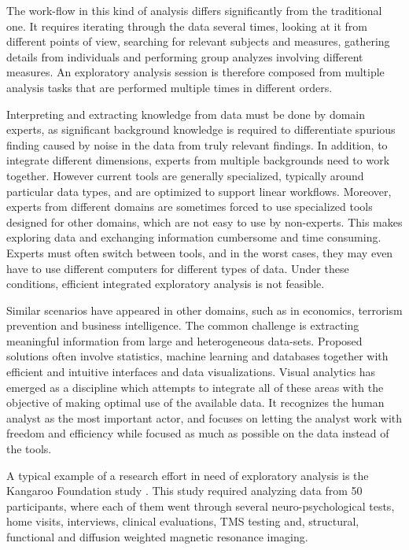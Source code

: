 \documentclass[utf8,paper]{frontiersSCNS} %
\begin{document}
				
The work-flow in this kind of analysis differs significantly from the traditional one. It requires iterating through the data several times, looking at it from different points of view, searching for relevant subjects and measures, gathering details from individuals and performing group analyzes involving different measures. An exploratory analysis session is therefore composed from multiple analysis tasks that are performed multiple times in different orders.

Interpreting and extracting knowledge from data must be done by domain experts, as significant background knowledge is required to differentiate spurious finding caused by noise in the data from truly relevant findings. In addition, to integrate different dimensions, experts from multiple backgrounds need to work together. However current tools are generally specialized, typically around particular data types, and are optimized to support linear workflows. Moreover, experts from different domains are sometimes forced to use specialized tools designed for other domains, which are not easy to use by non-experts.  This makes exploring data and exchanging information cumbersome and time consuming. Experts must often switch between tools, and in the worst cases, they may even have to use different computers for different types of data. Under these conditions, efficient integrated exploratory analysis is not feasible. 

					
Similar scenarios have appeared in other domains, such as in economics, terrorism prevention and business intelligence. The common challenge is extracting meaningful information from large and heterogeneous data-sets. Proposed solutions often involve statistics, machine learning and databases together with efficient and intuitive interfaces and data visualizations. Visual analytics \citep{keim_visual_2008} has emerged as a discipline which attempts to integrate all of these areas with the objective of making optimal use of the available data. It recognizes the human analyst as the most important actor, and focuses on letting the analyst work with freedom and efficiency while focused as much as possible on the data instead of the tools.
					
A typical example of a research effort in need of exploratory analysis is the Kangaroo Foundation study \cite{schneider_cerebral_2012}. This study required analyzing data from 50 participants, where each of them went through several neuro-psychological tests, home visits, interviews, clinical evaluations, TMS testing and, structural, functional and diffusion weighted magnetic resonance imaging. 
\end{document}

